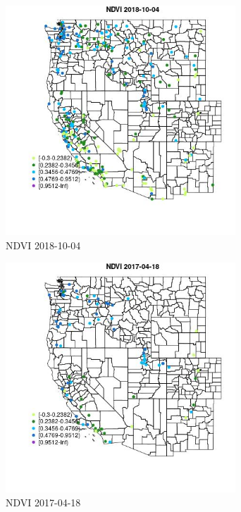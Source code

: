 \begin{figure} 
\centering  
\includegraphics[width=0.77\textwidth]{Code_Outputs/Report_ML_input_PM25_Step4_part_f_de_duplicated_aves_prioritize_24hr_obswNAs_MapObsNDVI2018-10-04.jpg} 
\caption{\label{fig:Report_ML_input_PM25_Step4_part_f_de_duplicated_aves_prioritize_24hr_obswNAsMapObsNDVI2018-10-04}NDVI 2018-10-04} 
\end{figure} 
 

\begin{figure} 
\centering  
\includegraphics[width=0.77\textwidth]{Code_Outputs/Report_ML_input_PM25_Step4_part_f_de_duplicated_aves_prioritize_24hr_obswNAs_MapObsNDVI2017-04-18.jpg} 
\caption{\label{fig:Report_ML_input_PM25_Step4_part_f_de_duplicated_aves_prioritize_24hr_obswNAsMapObsNDVI2017-04-18}NDVI 2017-04-18} 
\end{figure} 
 
